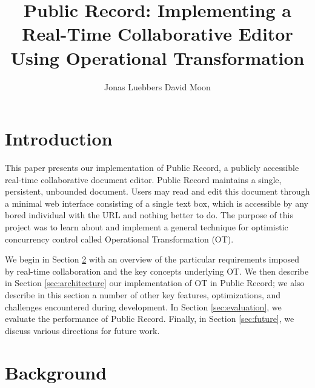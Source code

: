 \documentclass[letterpaper,11pt,twocolumn]{article}
\begin{document}
\title{Public Record: Implementing a Real-Time Collaborative Editor 
Using Operational Transformation
}
\date{}

\author{
  {\rm Jonas Luebbers}\hspace{1cm}
  {\rm David Moon}
\vspace{1cm}
}

\maketitle



\thispagestyle{empty}
                   
                                   
\section{Introduction}

This paper presents our implementation of Public Record, a publicly accessible real-time collaborative document editor.  Public Record maintains a single, persistent, unbounded document.  Users may read and edit this document through a minimal web interface consisting of a single text box, which is accessible by any bored individual with the URL and nothing better to do.  The purpose of this project was to learn about and implement a general technique for optimistic concurrency control called Operational Transformation (OT).

We begin in Section \ref{sec:background} with an overview of the particular requirements imposed by real-time collaboration and the key concepts underlying OT.  We then describe in Section \ref{sec:architecture} our implementation of OT in Public Record; we also describe in this section a number of other key features, optimizations, and challenges encountered during development.  In Section \ref{sec:evaluation}, we evaluate the performance of Public Record.  Finally, in Section \ref{sec:future}, we discuss various directions for future work.




\section{Background} \label{sec:background}
\end{document}
